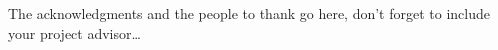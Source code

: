 \documentclass[
10pt, %
english, 
headsepline, %
]{thesis}
\begin{document}

\begin{acknowledgements}
\addchaptertocentry{\acknowledgementname} %
The acknowledgments and the people to thank go here, don't forget to include your project advisor\ldots
\end{acknowledgements}


\tableofcontents %



\mainmatter %

\pagestyle{thesis} %





\cleardoublepage
{}
{}



\appendix 






\end{document}
